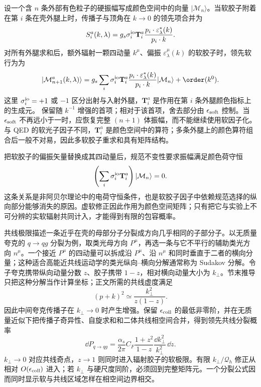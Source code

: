 设一个含 $n$ 条外部有色粒子的硬振幅写成颜色空间中的向量 $|\mathcal M_n\rangle$。当软胶子附着在第 $i$ 条在壳外腿上时，传播子与顶角在 $k\to0$ 的领先项合并为
\begin{equation}
{
 S_i^a(k,\lambda)
 =g_s\sigma_i^{\rm io}\mathbf T_i^a
 \frac{p_i\cdot\varepsilon_\lambda^*(k)}{p_i\cdot k}.}
\label{eq:qcd-soft-leg-factor-dp68}
\end{equation}
对所有外腿求和后，额外辐射一颗四动量 $k^\mu$、偏振 $\varepsilon_\lambda^\mu(k)$ 的软胶子时，领先软行为为
\begin{equation}
 {
 |\mathcal M_{n+1}^{a}(k,\lambda)\rangle
 =g_s\sum_i\sigma_i^{\rm io}
 \mathbf T_i^a
 \frac{p_i\cdot\varepsilon_\lambda^*(k)}{p_i\cdot k}
 |\mathcal M_n\rangle
 +\order(k^0).}
 \label{eq:qcd-soft-gluon-theorem-dp10}
\end{equation}
这里 $\sigma_i^{\rm io}=+1$ 或 $-1$ 区分出射与入射外腿，$\mathbf T_i^a$ 是作用在第 $i$ 条外腿颜色指标上的生成元。 保留随 $k^{-1}$ 增强的首项；相对于该首项，舍去部分由 $\epsilon_{\rm soft}$ 控制。当 $\epsilon_{\rm soft}$ 不再远小于一时，应恢复完整 $(n+1)$ 体振幅，而不能继续使用软因子化。与 QED 的软光子因子不同，$\mathbf T_i^a$ 是颜色空间中的算符；多条外腿上的颜色算符组合后一般不对易，因此多软胶子重求和具有矩阵结构。

把软胶子的偏振矢量替换成其四动量后，规范不变性要求振幅满足颜色荷守恒
\begin{equation}
 {
 \left(\sum_i\sigma_i^{\rm io}\mathbf T_i^a\right)|\mathcal M_n\rangle=0.}
 \label{eq:qcd-color-charge-conservation-amplitude-dp10}
\end{equation}
这条关系是非阿贝尔理论中的电荷守恒条件，也是软胶子因子中依赖规范选择的纵向部分能够消失的原因。虚软修正因此作用为颜色空间矩阵；只有把它与实验上不可分辨的实软辐射共同计入，才能得到有限的包容概率。

共线极限描述一条近乎在壳的母部分子分裂成方向几乎相同的子部分子。以无质量夸克的 $q\to qg$ 分裂为例，取类光母方向 $P^\mu$，再选一条与它不平行的辅助类光方向 $n^\mu$。一个接近 $P^\mu$ 的四动量可以拆成沿 $P^\mu$、沿 $n^\mu$ 和同时垂直于二者的横向分量；这种适合高能近共线运动学的类光纵向--横向分解通常称为 Sudakov 分解。令子夸克携带纵向动量分数 $z$、胶子携带 $1-z$，相对横向动量大小为 $k_\perp$。节末推导只把这种分解当作计算坐标；正文所需的共线虚度满足
\begin{equation}
{
 (p+k)^2\simeq\frac{k_\perp^2}{z(1-z)}.}
\label{eq:qcd-collinear-virtuality-dp68}
\end{equation}
因此中间夸克传播子在 $k_\perp\to0$ 时产生增强。保留 $\epsilon_{\rm coll}$ 的最低非零阶，并在无质量近似下把传播子奇异性、自旋求和和二体共线相空间合并，得到领先共线分裂概率
\begin{equation}
 {
 \dd P_{q\to qg}
 =\frac{\alpha_s}{2\pi}
 C_F\frac{1+z^2}{1-z}
 \frac{\dd k_\perp^2}{k_\perp^2}\,\dd z.}
 \label{eq:q-to-qg-splitting-probability-dp10}
\end{equation}
$k_\perp\to0$ 对应共线奇点，$z\to1$ 则同时进入辐射胶子的软极限。有限 $k_\perp/\mathcal Q_h$ 修正从相对 $O(\epsilon_{\rm coll})$ 进入；若 $k_\perp$ 与硬尺度同阶，必须回到完整矩阵元。一个分裂公式因而同时显示软与共线区域怎样在相空间边界相交。

